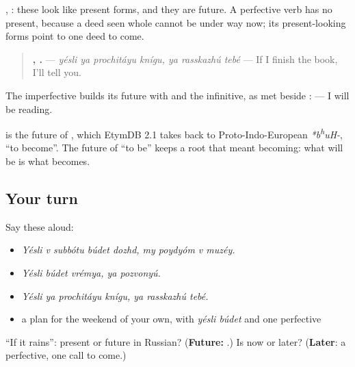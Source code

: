 \begin{grammarlens}[title={Grammar Lens: a perfective points forward}]
\textbf{}, \textbf{}: these look like present forms, and they are future. A perfective verb has no present, because a deed seen whole cannot be under way now; its present-looking forms point to one deed to come.

\begin{quote}
\textbf{   ,   .} — \emph{yésli ya prochitáyu knígu, ya rasskazhú tebé} — If I finish the book, I'll tell you.
\end{quote}

The imperfective builds its future with \emph{} and the infinitive, as met beside \emph{}: \textbf{  } — I will be reading.
\end{grammarlens}

\begin{cousinweb}
\textbf{} is the future of \textbf{}, which EtymDB 2.1 takes back to Proto-Indo-European \emph{*b\textsuperscript{h}uH-}, \textquotedblleft{}to become\textquotedblright{}. The future of \textquotedblleft{}to be\textquotedblright{} keeps a root that meant becoming: what will be is what becomes.
\end{cousinweb}

\subsection*{Your turn}
Say these aloud:

\begin{itemize}
\raggedright
  \item \emph{Yésli v subbótu búdet dozhd, my poydyóm v muzéy.}
  \item \emph{Yésli búdet vrémya, ya pozvonyú.}
  \item \emph{Yésli ya prochitáyu knígu, ya rasskazhú tebé.}
  \item a plan for the weekend of your own, with \emph{yésli búdet} and one perfective
\end{itemize}

\begin{tcolorbox}[breakable,colback=teal!4,colframe=teal!35!black,title={Before you move on}]
\textquotedblleft{}If it rains\textquotedblright{}: present or future in Russian? (\textbf{Future:} \emph{\textbf{  }}.) Is \emph{} now or later? (\textbf{Later}: a perfective, one call to come.)
\end{tcolorbox}
